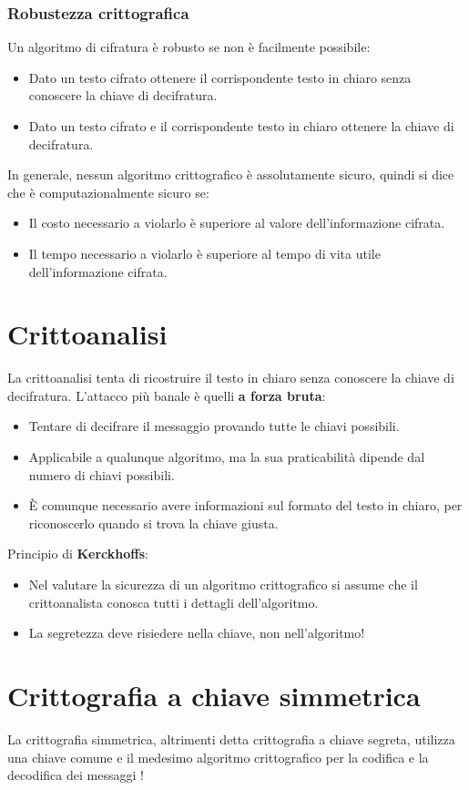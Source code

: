 \documentclass[oneside,a4paper,11pt]{book}
\theoremstyle{italicstyle}
\theoremstyle{normStyle}
\begin{document}
\subsubsection{Robustezza crittografica}
Un algoritmo di cifratura è robusto se non è facilmente possibile:
\begin{itemize}
  \item Dato un testo cifrato ottenere il corrispondente testo in chiaro senza conoscere la chiave di decifratura.
  \item Dato un testo cifrato e il corrispondente testo in chiaro ottenere la chiave di decifratura.
\end{itemize}
In generale, nessun algoritmo crittografico è assolutamente sicuro, quindi si dice che è computazionalmente sicuro se:
\begin{itemize}
  \item Il costo necessario a violarlo è superiore al valore dell’informazione cifrata.
  \item Il tempo necessario a violarlo è superiore al tempo di vita utile dell’informazione cifrata.
\end{itemize}
\section{Crittoanalisi}
La crittoanalisi tenta di ricostruire il testo in chiaro senza conoscere la chiave di decifratura.
L'attacco più banale è quelli \textbf{a forza bruta}:
\begin{itemize}
  \item Tentare di decifrare il messaggio provando tutte le chiavi possibili. 
  \item Applicabile a qualunque algoritmo, ma la sua praticabilità dipende dal numero di chiavi possibili.
  \item È  comunque necessario avere informazioni sul formato del testo in chiaro, per riconoscerlo quando si trova la chiave giusta.
\end{itemize}
Principio di \textbf{Kerckhoffs}:
\begin{itemize}
  \item Nel valutare la sicurezza di un algoritmo crittografico si assume che il crittoanalista conosca tutti i dettagli dell’algoritmo.
  \item La segretezza deve risiedere nella chiave, non nell’algoritmo! 
\end{itemize}
\section{Crittografia a chiave simmetrica}
La crittografia simmetrica, altrimenti detta crittografia a chiave segreta,
utilizza una chiave comune e il medesimo algoritmo crittografico per
la codifica e la decodifica dei messaggi !
\end{document}
